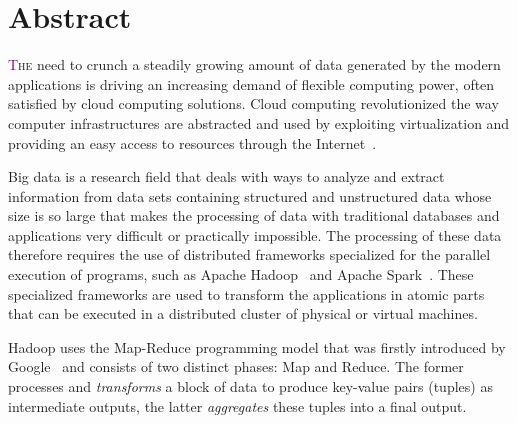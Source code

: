 
\begingroup
\let\clearpage\relax
\let\cleardoublepage\relax
\let\cleardoublepage\relax

\chapter*{Abstract}
\lettrine[lines=4]{\textcolor{purple}{T}}{he} need to crunch a steadily growing amount of data generated by the modern applications is driving an increasing demand of flexible computing power,  often satisfied by cloud computing solutions. Cloud computing  revolutionized the way computer infrastructures are abstracted and used by exploiting virtualization and providing an easy access to resources through the Internet~\cite{articleBigData:2017}.


Big data is a research field that deals with ways to analyze and extract information from data sets containing structured and unstructured data whose size is so large that makes the processing of data with traditional databases and applications very difficult or practically impossible. The processing of these data therefore requires the use of distributed frameworks specialized for the parallel execution of programs, such as Apache Hadoop~\cite{misc:ApacheHadoop} and Apache Spark~\cite{misc:ApacheSpark}. These specialized frameworks are used to transform the applications in atomic parts that can be executed in a distributed cluster of physical or virtual machines. 

Hadoop uses the Map-Reduce programming model that was firstly introduced by Google~\cite{misc:GoogleMapReduce} and consists of two distinct phases: Map and Reduce. %
The former processes and \textit{transforms} a block of data to produce key-value pairs (tuples) as intermediate outputs, the latter \textit{aggregates} these tuples into a final output.

